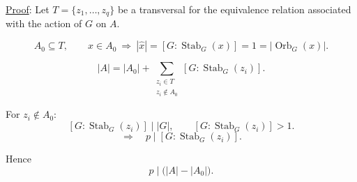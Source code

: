 \bigskip
\noindent\underline{Proof}: Let $T=\{z_1,\ldots,z_q\}$
be a transversal for the equivalence relation associated with the action of $G$ on $A$.

\[
A_0\subseteq T,\qquad
x\in A_0\ \Longrightarrow\
|\widehat{x}|=[G:\operatorname{Stab}_G(x)]=1
=|\operatorname{Orb}_G(x)|.
\]

\[
|A|=|A_0|+
\sum_{\substack{z_i\in T\\z_i\notin A_0}}
[G:\operatorname{Stab}_G(z_i)].
\]

\noindent For $z_i\notin A_0$:
\[
[G:\operatorname{Stab}_G(z_i)]\mid |G|,
\qquad [G:\operatorname{Stab}_G(z_i)]>1.
\]
\[
\Longrightarrow\quad p\mid[G:\operatorname{Stab}_G(z_i)].
\]

\noindent Hence
\[
p\mid\bigl(|A|-|A_0|\bigr).
\]
